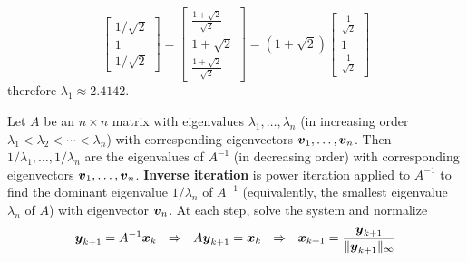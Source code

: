 \begin{example}
$$\begin{bmatrix} 1/\sqrt{2} \\ 1 \\ 1/\sqrt{2} \end{bmatrix}
=
\begin{bmatrix} \frac{1 + \sqrt{2}}{\sqrt{2}} \\ 1 + \sqrt{2} \\ \frac{1 + \sqrt{2}}{\sqrt{2}} \end{bmatrix}
=
(1 + \sqrt{2}) \begin{bmatrix} \frac{1}{\sqrt{2}} \\ 1 \\ \frac{1}{\sqrt{2}} \end{bmatrix}
$$
therefore $\lambda_1 \approx 2.4142$.
\end{example}

\begin{definition}
Let $A$ be an $n \times n$ matrix with eigenvalues $\lambda_1,\dots,\lambda_n$ (in increasing order $\lambda_1 < \lambda_2 < \cdots < \lambda_n$) with corresponding eigenvectors $\boldsymbol{v}_1,\dots,\boldsymbol{v}_n$. Then $1/\lambda_1,\dots,1/\lambda_n$ are the eigenvalues of $A^{-1}$ (in decreasing order) with corresponding eigenvectors $\boldsymbol{v}_1,\dots,\boldsymbol{v}_n$. {\bf Inverse iteration} \cite[p.175]{MH} is power iteration applied to $A^{-1}$ to find the dominant eigenvalue $1/\lambda_n$ of $A^{-1}$ (equivalently, the smallest eigenvalue $\lambda_n$ of $A$) with eigenvector $\boldsymbol{v}_n$. At each step, solve the system and normalize
$$
\bs{y}_{k+1} = A^{-1} \bs{x}_k \ \ \Rightarrow \ \ A \bs{y}_{k+1} = \bs{x}_k \ \ \Rightarrow \ \ \bs{x}_{k+1} = \frac{\bs{y}_{k+1}}{\| \bs{y}_{k+1} \|_{\infty}}
$$
\end{definition}

